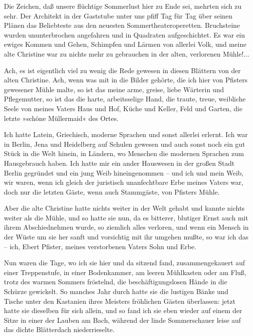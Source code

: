 Die Zeichen, daß unsere flüchtige Sommerlust hier zu Ende sei,
mehrten sich zu sehr. Der Architekt in der Gaststube unter uns
pfiff Tag für Tag über seinen Plänen das Beliebteste aus den
neuesten Sommertheateroperetten. Bruchsteine wurden ununterbrochen
angefahren und in Quadraten aufgeschichtet. Es war ein ewiges
Kommen und Gehen, Schimpfen und Lärmen von allerlei Volk, und meine
alte Christine war zu nichts mehr zu gebrauchen in der alten,
verlorenen Mühle!...

Ach, es ist eigentlich viel zu wenig die Rede gewesen in diesen
Blättern von der alten Christine. Ach, wenn was mit in die Bilder
gehörte, die ich hier von Pfisters gewesener Mühle malte, so ist
das meine arme, greise, liebe Wärterin und Pflegemutter, so ist das
die harte, arbeitsselige Hand, die traute, treue, weibliche Seele
von meines Vaters Haus und Hof, Küche und Keller, Feld und Garten,
die letzte »schöne Müllermaid« des Ortes.

Ich hatte Latein, Griechisch, moderne Sprachen und sonst allerlei
erlernt. Ich war in Berlin, Jena und Heidelberg auf Schulen gewesen
und auch sonst noch ein gut Stück in die Welt hinein, in Ländern,
wo Menschen die modernen Sprachen zum Hausgebrauch haben. Ich hatte
mir ein ander Hauswesen in der großen Stadt Berlin gegründet und
ein jung Weib hineingenommen – und ich und mein Weib, wir waren,
wenn ich gleich der juristisch unanfechtbare Erbe meines Vaters
war, doch nur die letzten Gäste, wenn auch Stammgäste, von Pfisters
Mühle.

Aber die alte Christine hatte nichts weiter in der Welt gehabt und
kannte nichts weiter als die Mühle, und so hatte sie nun, da es
bitterer, blutiger Ernst auch mit ihrem Abschiednehmen wurde, so
ziemlich alles verloren, und wenn ein Mensch in der Wüste um sie
her sanft und vorsichtig mit ihr umgehen mußte, so war ich das –
ich, Ebert Pfister, meines verstorbenen Vaters Sohn und Erbe.

Nun waren die Tage, wo ich sie hier und da sitzend fand,
zusammengekauert auf einer Treppenstufe, in einer Bodenkammer, am
leeren Mühlkasten oder am Fluß, trotz des warmen Sommers fröstelnd,
die beschäftigungslosen Hände in die Schürze gewickelt. So manches
Jahr durch hatte sie die lustigen Bänke und Tische unter den
Kastanien ihres Meisters fröhlichen Gästen überlassen: jetzt hatte
sie dieselben für sich allein, und so fand ich sie eben wieder auf
einem der Sitze in einer der Lauben am Bach, während der linde
Sommerschauer leise auf das dichte Blätterdach niederrieselte.

